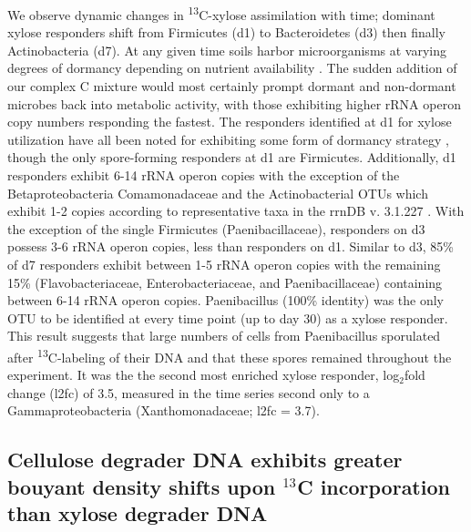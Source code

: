 We observe dynamic changes in \textsuperscript{13}C-xylose assimilation with
time; dominant xylose responders shift from Firmicutes (d1) to Bacteroidetes
(d3) then finally Actinobacteria (d7). At any given time soils harbor
microorganisms at varying degrees of dormancy depending on nutrient
availability \cite{Jones_2010}. The sudden addition of our complex C mixture
would most certainly prompt dormant and non-dormant microbes back into
metabolic activity, with those exhibiting higher rRNA operon copy numbers
responding the fastest. The responders identified at d1 for xylose utilization
have all been noted for exhibiting some form of dormancy strategy
\cite{Jones_2010, Mulyukin_2009, Darcy_2011, Sachidanandham_2008, Finkel_2006,
Rittershaus_2013, Tada_2013, Lay_2013}, though the only spore-forming
responders at d1 are Firmicutes. Additionally, d1 responders exhibit 6-14 rRNA
operon copies with the exception of the Betaproteobacteria Comamonadaceae and
the Actinobacterial OTUs which exhibit 1-2 copies according to representative
taxa in the rrnDB v. 3.1.227 \cite{18948294,11125085}. With the exception of
the single Firmicutes (Paenibacillaceae), responders on d3 possess 3-6 rRNA
operon copies, less than responders on d1. Similar to d3, 85\% of d7 responders
exhibit between 1-5 rRNA operon copies with the remaining 15\%
(Flavobacteriaceae, Enterobacteriaceae, and Paenibacillaceae) containing
between 6-14 rRNA operon copies. Paenibacillus (100\% identity) was the only
OTU to be identified at every time point (up to day 30) as a xylose responder.
This result suggests that large numbers of cells from Paenibacillus sporulated
after \textsuperscript{13}C-labeling of their DNA and that these spores
remained throughout the experiment. It was the the second most enriched xylose
responder, log$_{2}$fold change (l2fc) of 3.5, measured in the time series
second only to a Gammaproteobacteria (Xanthomonadaceae; l2fc = 3.7).

\subsection{Cellulose degrader DNA exhibits greater bouyant density shifts upon $^{13}$C incorporation than xylose degrader DNA}
